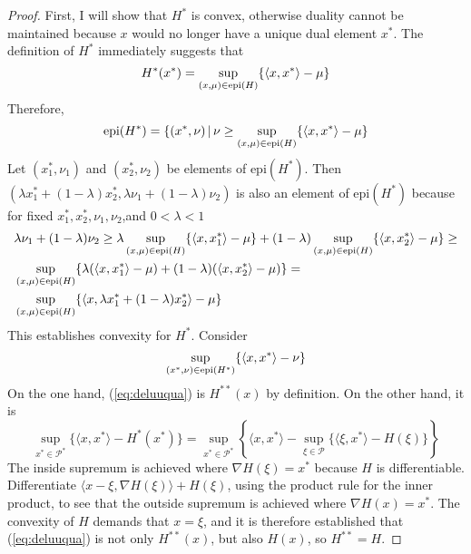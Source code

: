 \documentclass[12pt]{article}
\begin{document}
\begin{proof}
  \label{prf:pivailah}
  First, I will show that $H^{\ast}$ is convex, otherwise duality
  cannot be maintained because $x$ would no longer have a unique dual
  element $x^{\ast}$. The definition of $H^{\ast}$ immediately
  suggests that
  \begin{equation}
    \label{eq:phuuquoo}
    H^{\ast}(x^{\ast})=\sup_{(x,\mu)\in\mbox{\scriptsize epi}(H)}\{\langle{}x,x^{\ast}\rangle-\mu\}
  \end{equation}
  Therefore,
  \begin{equation}
    \label{eq:reicedik}
    \mbox{epi}(H^{\ast})=\{(x^{\ast},\nu)\,\vert\,\nu\geq\sup_{(x,\mu)\in\mbox{\scriptsize epi}(H)}\{\langle{}x,x^{\ast}\rangle-\mu\}
  \end{equation}
Let $(x_{1}^{\ast},\nu_{1})$ and $(x_{2}^{\ast},\nu_{2})$ be elements
of $\mbox{epi}(H^{\ast})$. Then
$(\lambda{}x_{1}^{\ast}+(1-\lambda)x_{2}^{\ast},\lambda\nu_{1}+(1-\lambda)\nu_{2})$
is also an element of $\mbox{epi}(H^{\ast})$ because for fixed
$x_{1}^{\ast},x_{2}^{\ast},\nu_{1},\nu_{2}$,and $0<\lambda<1$
\begin{equation}
  \label{eq:saedeeva}
  \begin{split}
  & \lambda\nu_{1}+(1-\lambda)\nu_{2}\geq\lambda\sup_{(x,\mu)\in\mbox{\scriptsize epi}(H)}\{\langle{}x,x_{1}^{\ast}\rangle-\mu\}+(1-\lambda)\sup_{(x,\mu)\in\mbox{\scriptsize epi}(H)}\{\langle{}x,x_{2}^{\ast}\rangle-\mu\}\geq \\
  & \sup_{(x,\mu)\in\mbox{\scriptsize epi}(H)}\{\lambda(\langle{}x,x_{1}^{\ast}\rangle-\mu)+(1-\lambda)(\langle{}x,x_{2}^{\ast}\rangle-\mu)\}= \\
  & \sup_{(x,\mu)\in\mbox{\scriptsize epi}(H)}\{\langle{}x,\lambda{}x_{1}^{\ast}+(1-\lambda)x_{2}^{\ast}\rangle-\mu\}
  \end{split}
\end{equation}
This establishes convexity for $H^{\ast}$. Consider
\begin{equation}
  \label{eq:deluuqua}
  \sup_{(x^{\ast},\nu)\in\mbox{\scriptsize epi}(H^{\ast})}\{\langle{}x,x^{\ast}\rangle-\nu\}
\end{equation}
On the one hand, (\ref{eq:deluuqua}) is $H^{\ast\ast}(x)$ by
definition. On the other hand, it is
\begin{equation}
  \label{eq:geifahve}
  \sup_{x^{\ast}\in\mathcal{P}^{\ast}}\{\langle{}x,x^{\ast}\rangle-H^{\ast}(x^{\ast})\}=\sup_{x^{\ast}\in\mathcal{P}^{\ast}}\left\{\langle{}x,x^{\ast}\rangle-\sup_{\xi\in\mathcal{P}}\{\langle\xi,x^{\ast}\rangle-H(\xi)\}\right\}
\end{equation}
The inside supremum is achieved where $\nabla{}H(\xi)=x^{\ast}$
because $H$ is differentiable. Differentiate
$\langle{}x-\xi,\nabla{}H(\xi)\rangle+H(\xi)$, using the product rule
for the inner product, to see that the outside supremum is achieved
where $\nabla{}H(x)=x^{\ast}$. The convexity of $H$ demands that
$x=\xi$, and it is therefore established that (\ref{eq:deluuqua}) is
not only $H^{\ast\ast}(x)$, but also $H(x)$, so $H^{\ast\ast}=H$.
\end{proof}
\end{document}
